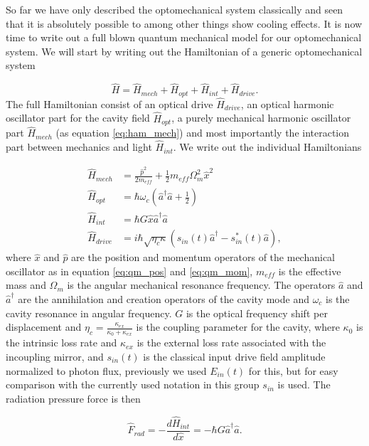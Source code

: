 So far we have only described the optomechanical system classically and seen that it is absolutely possible to  among other things show cooling effects. It is now time to write out a full blown quantum mechanical model for our optomechanical system. We will start by writing out the Hamiltonian of a generic optomechanical system \cite{law1995}

\begin{equation}
\hat{H} = \hat{H}_{mech} + \hat{H}_{opt} + \hat{H}_{int} + \hat{H}_{drive}.
\end{equation}
\noindent
The full Hamiltonian consist of an optical drive $\hat{H}_{drive}$, an optical harmonic oscillator part for the cavity field $\hat{H}_{opt}$, a purely mechanical harmonic oscillator part $\hat{H}_{mech}$ (as equation \eqref{eq:ham_mech}) and most importantly the interaction part between mechanics and light $\hat{H}_{int}$. We write out the individual Hamiltonians

\begin{align}
\hat{H}_{mech} & = \frac{\hat{p}^2}{2m_{eff}} + \frac{1}{2}m_{eff}\Omega_m^2\hat{x}^2 \\
\hat{H}_{opt} & = \hbar\omega_c\left( \hat{a}^\dagger\hat{a} + \frac{1}{2}\right) \\
\hat{H}_{int} & = \hbar G\hat{x}\hat{a}^\dagger\hat{a} \\
\hat{H}_{drive} & = i\hbar\sqrt{\eta_c\kappa}(s_{in}(t)\hat{a}^\dagger - s_{in}^*(t)\hat{a}),
\end{align}
\noindent
where $\hat{x}$ and $\hat{p}$ are the position and momentum operators of the mechanical oscillator as in equation \eqref{eq:qm_pos} and \eqref{eq:qm_mom}, $m_{eff}$ is the effective mass and $\Omega_m$ is the angular mechanical resonance frequency. The operators $\hat{a}$ and $\hat{a}^\dagger$ are the annihilation and creation operators of the cavity mode and $\omega_c$ is the cavity resonance in angular frequency. $G$ is the optical frequency shift per displacement and $\eta_c = \frac{\kappa_{ex}}{\kappa_0 + \kappa_{ex}}$ is the coupling parameter for the cavity, where $\kappa_0$ is the intrinsic loss rate and $\kappa_{ex}$ is the external loss rate associated with the incoupling mirror, and $s_{in}(t)$ is the classical input drive field amplitude normalized to photon flux, previously we used $E_{in}(t)$ for this, but for easy comparison with the currently used notation in this group $s_{in}$ is used. The radiation pressure force is then 

\begin{equation}
\hat{F}_{rad} = -\frac{d\hat{H}_{int}}{d\hat{x}} = -\hbar G\hat{a}^\dagger\hat{a}.
\end{equation}